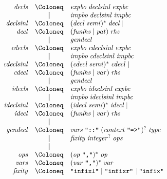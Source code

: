 \begin{align*}
  \begin{array}{rcl}
    \mathit{decls}
    & \Coloneq & \mathit{expbo}\; \mathit{declsinl}\; \mathit{expbc} \\
    & \mid & \mathit{impbo}\; \mathit{declsinl}\; \mathit{impbc} \\
    \mathit{declsinl}
    & \Coloneq & (\mathit{decl}\; \mathit{semi})^*\; \mathit{decl} \mid \\
    \mathit{decl}
    & \Coloneq & (\mathit{funlhs} \mid \mathit{pat})\; \mathit{rhs} \\
    & \mid & \mathit{gendecl} \\
    \mathit{cdecls}
    & \Coloneq & \mathit{expbo}\; \mathit{cdeclsinl}\; \mathit{expbc} \\
    & \mid & \mathit{impbo}\; \mathit{cdeclsinl}\; \mathit{impbc} \\
    \mathit{cdeclsinl}
    & \Coloneq & (\mathit{cdecl}\; \mathit{semi})^*\; \mathit{cdecl} \mid \\
    \mathit{cdecl}
    & \Coloneq & (\mathit{funlhs} \mid \mathit{var})\; \mathit{rhs} \\
    & \mid & \mathit{gendecl} \\
    \mathit{idecls}
    & \Coloneq & \mathit{expbo}\; \mathit{ideclsinl}\; \mathit{expbc} \\
    & \mid & \mathit{impbo}\; \mathit{ideclsinl}\; \mathit{impbc} \\
    \mathit{ideclsinl}
    & \Coloneq & (\mathit{idecl}\; \mathit{semi})^*\; \mathit{idecl} \mid \\
    \mathit{idecl}
    & \Coloneq & (\mathit{funlhs} \mid \mathit{var})\; \mathit{rhs} \\
    & \mid & \\
    \mathit{gendecl}
    & \Coloneq & \mathit{vars}\; \text{\texttt{\textquotedbl ::\textquotedbl}}\; (\mathit{context}\; \text{\texttt{\textquotedbl =>\textquotedbl}})^?\; \mathit{type} \\
    & \mid & \mathit{fixity}\; \mathit{integer}^?\; \mathit{ops} \\
    & \mid & \\
    \mathit{ops}
    & \Coloneq & (\mathit{op}\; \text{\texttt{\textquotedbl,\textquotedbl}})^*\; \mathit{op} \\
    \mathit{vars}
    & \Coloneq & (\mathit{var}\; \text{\texttt{\textquotedbl,\textquotedbl}})^*\; \mathit{var} \\
    \mathit{fixity}
    & \Coloneq & \text{\texttt{\textquotedbl infixl\textquotedbl}}
    \mid \text{\texttt{\textquotedbl infixr\textquotedbl}}
    \mid \text{\texttt{\textquotedbl infix\textquotedbl}}
  \end{array}
\end{align*}

